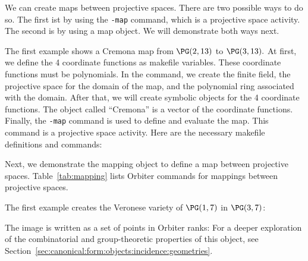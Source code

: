 



We can create maps between projective spaces. 
There are two possible ways to do so.
The first ist by using the \verb'-map' command, which is a projective space activity.
The second is by using a map object.
We will demonstrate both ways next.


\bigskip


The first example shows a Cremona map from $\PG(2,13)$ to $\PG(3,13).$ 
At first, we define the 4 coordinate functions as makefile variables. 
These coordinate functions must be polynomials. 
In the command, we create the finite field, the projective space for the domain of the map, 
and the polynomial ring associated with the domain. 
After that, we will create symbolic objects for the 4 coordinate functions. 
The object called ``Cremona'' is a vector of the coordinate functions. 
Finally, the \verb'-map' command is used to define and evaluate the map. 
This command is a projective space activity.
Here are the necessary makefile definitions and commands:












\bigskip






Next, we demonstrate the mapping object 
to define a map between projective spaces. 
Table~\ref{tab:mapping} lists Orbiter 
commands for mappings between projective spaces.


The first example creates the Veronese variety of $\PG(1,7)$ in $\PG(3,7)$:


The image is written as a set of points in Orbiter ranks:
For a deeper exploration of the combinatorial and group-theoretic properties of this object, 
see Section~\ref{sec:canonical:form:objects:incidence:geometries}.

\bigskip

